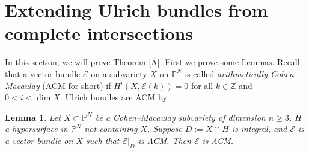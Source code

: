 \documentclass[11pt,letterpaper]{amsart}
\newtheorem{lemma}{Lemma}[section]
\begin{document}
\section{Extending Ulrich bundles from complete intersections}
In this section, we will prove Theorem \ref{A}. First we prove some Lemmas. Recall that a vector bundle $\mathcal{E}$ on a subvariety $X$ on $\mathbb{P}^N$ is called \textit{arithmetically Cohen-Macaulay} (ACM for short) if $H^i(X,\mathcal{E}(k))=0$ for all $k\in\mathbb{Z}$ and $0<i<\dim X$. Ulrich bundles are ACM by \cite[\S 2, (2.1)]{beauville2018introduction}.
\begin{lemma}\label{ACM}
Let $X\subset \mathbb{P}^N$ be a Cohen--Macaulay subvariety of
dimension $n\ge 3$, $H$ a hypersurface in $\mathbb{P}^N$
not containing $X$. Suppose $D:=X\cap H$
is integral, and $\mathcal{E}$ is a vector bundle on $X$ such that
$\mathcal{E}|_D$ is ACM. Then $\mathcal{E}$ is ACM.
\end{lemma}
\end{document}
